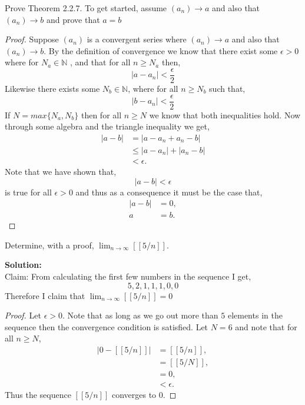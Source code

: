 \documentclass[12pt]{article}
\makeatletter
\theoremstyle{homework}
\newenvironment{exercise}[1]
{\def\@currentlabel{#1}\exercisecore}
{\endexercisecore}
\newcommand{\localhead}[1]{\par\smallskip\noindent\textbf{#1}\nobreak\\}%
\newcommand\solution{\localhead{Solution:}}
\newcommand{\Nats}{\ensuremath{\mathbb N}}
\makeatother
\begin{document}
\begin{exercise}{2.2.6}
Prove Theorem 2.2.7. To get started, assume $(a_n) \to a$ and also that $(a_n) \to b$ and prove that $a = b$
\end{exercise}
\begin{proof} Suppose $(a_n)$ is a convergent series where $(a_n) \to a$ and also that $(a_n) \to b$. By the definition of convergence we know that
	there exist some $\epsilon > 0$ where for $N_a\in \Nats$ , and that for all $n \geq N_a$ then, 
	\begin{equation*}
		|a - a_n| < \frac{\epsilon}{2}
	\end{equation*}
	Likewise there exists some $N_b\in \Nats$, where for all $n \geq N_b$ such that,
	\begin{equation*}
		|b - a_n| < \frac{\epsilon}{2}
	\end{equation*} 
	If $N = max\{N_a,N_b\}$ then for all $n \geq N$ we know that both inequalities hold. Now through some algebra and the triangle inequality we get,
	\begin{align*}
		|a - b| &= |a - a_n + a_n - b|\\
		&\le |a - a_n| + |a_n - b|\\
		&< \epsilon.
	\end{align*}
Note that we have shown that, 
\begin{equation*}
	|a - b| < \epsilon
\end{equation*}
is true for all $\epsilon > 0$ and thus as a consequence it must be the case that,
\begin{align*}
	|a - b| &= 0,\\
	a &= b.
\end{align*}
\end{proof}

\begin{exercise}{2.2.5(a)}
Determine, with a proof, $\lim_{n\to\infty} [[5/n]]$.
\end{exercise}
\solution
Claim: From calculating the first few numbers in the sequence I get,
\begin{equation*}
	5,2,1,1,1,0,0
\end{equation*}
Therefore I claim that $\lim_{n\to\infty} [[5/n]] = 0$

\begin{proof} Let $\epsilon > 0$. Note that as long as we go out more than $5$ elements in the sequence then the convergence condition is satisfied. Let $N = 6$ and note that for all $n\geq N$,
	\begin{align*}
		|0 - [[5/n]]| &= [[5/n]],\\
					&= [[5/N]],\\
					&= 0,\\
					&< \epsilon.
	\end{align*} 
Thus the sequence $[[5/n]]$ converges to 0.
\end{proof}
\end{document}
